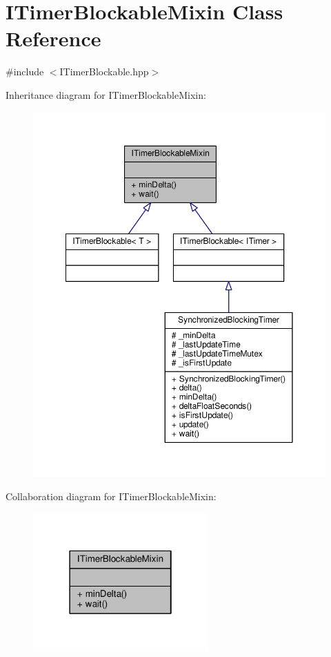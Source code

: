 \hypertarget{class_i_timer_blockable_mixin}{\section{I\-Timer\-Blockable\-Mixin Class Reference}
\label{class_i_timer_blockable_mixin}
}


{\ttfamily \#include $<$I\-Timer\-Blockable.\-hpp$>$}



Inheritance diagram for I\-Timer\-Blockable\-Mixin\-:
\nopagebreak
\begin{figure}[H]
\begin{center}
\leavevmode
\includegraphics[width=350pt]{class_i_timer_blockable_mixin__inherit__graph}
\end{center}
\end{figure}


Collaboration diagram for I\-Timer\-Blockable\-Mixin\-:
\nopagebreak
\begin{figure}[H]
\begin{center}
\leavevmode
\includegraphics[width=190pt]{class_i_timer_blockable_mixin__coll__graph}
\end{center}
\end{figure}
